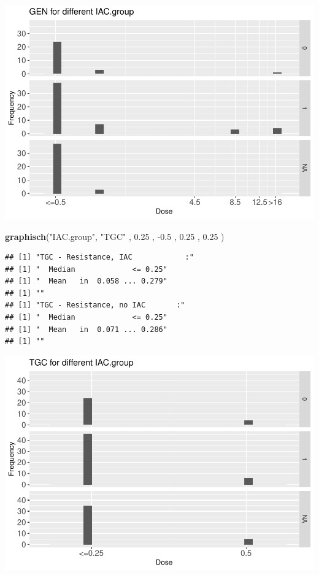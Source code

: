 \documentclass[
]{article}
\newenvironment{Shaded}{\begin{snugshade}}{\end{snugshade}}
\newcommand{\FloatTok}[1]{\textcolor[rgb]{0.00,0.00,0.81}{#1}}
\newcommand{\KeywordTok}[1]{\textcolor[rgb]{0.13,0.29,0.53}{\textbf{#1}}}
\newcommand{\NormalTok}[1]{#1}
\newcommand{\StringTok}[1]{\textcolor[rgb]{0.31,0.60,0.02}{#1}}
\begin{document}
\includegraphics{Verteilungen_files/figure-latex/unnamed-chunk-9-1.pdf}

\begin{Shaded}
\begin{Highlighting}[]
   \KeywordTok{graphisch}\NormalTok{(}\StringTok{"IAC.group"}\NormalTok{, }\StringTok{"TGC"}\NormalTok{ , }\FloatTok{0.25}\NormalTok{ ,  }\FloatTok{-0.5}\NormalTok{ ,   }\FloatTok{0.25}\NormalTok{ ,   }\FloatTok{0.25}\NormalTok{ )  }
\end{Highlighting}
\end{Shaded}

\begin{verbatim}
## [1] "TGC - Resistance, IAC            :"
## [1] "  Median             <= 0.25"
## [1] "  Mean   in  0.058 ... 0.279"
## [1] ""
## [1] "TGC - Resistance, no IAC       :"
## [1] "  Median             <= 0.25"
## [1] "  Mean   in  0.071 ... 0.286"
## [1] ""
\end{verbatim}

\includegraphics{Verteilungen_files/figure-latex/unnamed-chunk-10-1.pdf}
\end{document}
